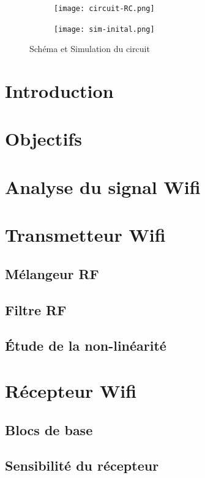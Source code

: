 \documentclass[11pt]{article}
\begin{document}
\begin{figure}[!htb]
  \begin{subfigure}[t]{.5\linewidth}
      \centering
      \texttt{[image: circuit-RC.png]}
      \label{fig:rccircuit}
  \end{subfigure}%
  \begin{subfigure}[t]{.5\linewidth}
    \centering
    \texttt{[image: sim-inital.png]}
    \label{fig:rccircuit-sim}
  \end{subfigure}%
  \caption{Sch\'ema et Simulation du circuit}
  \label{fig:RC-sim}
\end{figure}

\fi


\section{Introduction}
\section{Objectifs}

\section{Analyse du signal Wifi}

\section{Transmetteur Wifi}
\subsection{M\'elangeur RF}
\subsection{Filtre RF}
\subsection{\'Etude de la non-lin\'earit\'e}

\section{R\'ecepteur Wifi}
\subsection{Blocs de base}
\subsection{Sensibilit\'e du r\'ecepteur}
\end{document}
